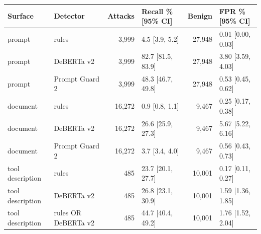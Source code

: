 \begin{tabular}{llrlrl}
\toprule
Surface & Detector & Attacks & Recall \% [95\% CI] & Benign & FPR \% [95\% CI] \\
\midrule
prompt & rules & 3,999 & 4.5 [3.9, 5.2] & 27,948 & 0.01 [0.00, 0.03] \\
prompt & DeBERTa v2 & 3,999 & 82.7 [81.5, 83.9] & 27,948 & 3.80 [3.59, 4.03] \\
prompt & Prompt Guard 2 & 3,999 & 48.3 [46.7, 49.8] & 27,948 & 0.53 [0.45, 0.62] \\
document & rules & 16,272 & 0.9 [0.8, 1.1] & 9,467 & 0.25 [0.17, 0.38] \\
document & DeBERTa v2 & 16,272 & 26.6 [25.9, 27.3] & 9,467 & 5.67 [5.22, 6.16] \\
document & Prompt Guard 2 & 16,272 & 3.7 [3.4, 4.0] & 9,467 & 0.56 [0.43, 0.73] \\
tool description & rules & 485 & 23.7 [20.1, 27.7] & 10,001 & 0.17 [0.11, 0.27] \\
tool description & DeBERTa v2 & 485 & 26.8 [23.1, 30.9] & 10,001 & 1.59 [1.36, 1.85] \\
tool description & rules OR DeBERTa v2 & 485 & 44.7 [40.4, 49.2] & 10,001 & 1.76 [1.52, 2.04] \\
\bottomrule
\end{tabular}

